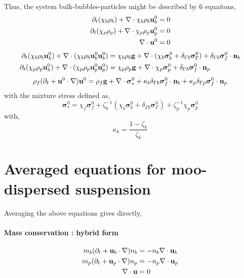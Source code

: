 \documentclass[12pt]{My_preprint}
\begin{document}
Thus, the system bulk-bubbles-particles might be described by 6 equaitons, 
\begin{align}
    \partial_t (\chi_b \rho_b)
    + \mathbf{\nabla}\cdot 
        \chi_b \rho_b \textbf{u}_b^0
    &= 
    0\\
    \partial_t (\chi_p \rho_p)
    + \mathbf{\nabla}\cdot 
        \chi_p \rho_p \textbf{u}_p^0
    &= 
    0\\
    \mathbf{\nabla}\cdot \textbf{u}^0
    &= 
    0
\end{align}
\begin{align}
    \partial_t (\chi_b \rho_b \textbf{u}^0_k)
    + \mathbf{\nabla}\cdot (
        \chi_b \rho_b \textbf{u}^0_b \textbf{u}_b^0
        )
    &= 
    \chi_b \rho_b \textbf{g}
    + \mathbf{\nabla}\cdot (\chi_b \bm\sigma_b^0  + \delta_{\Gamma b} \bm\sigma_\Gamma^0 )
    + \delta_{\Gamma b}  \bm\sigma_f^0 \cdot \textbf{n}_b\\
    \partial_t (\chi_p \rho_p \textbf{u}^0_k)
    + \mathbf{\nabla}\cdot (
        \chi_p \rho_p \textbf{u}^0_p \textbf{u}_p^0
        )
    &= 
    \chi_p \rho_p \textbf{g}
    + \mathbf{\nabla}\cdot \chi_p \bm\sigma_p^0  
    + \delta_{\Gamma b}  \bm\sigma_f^0 \cdot \textbf{n}_p
\end{align}
\begin{equation}
    \rho_f (\partial_t + \textbf{u}^0 \cdot \mathbf{\nabla})\textbf{u}^0
    = 
    \rho_f \textbf{g}
    + \mathbf{\nabla}\cdot \bm\sigma^0_*
    +\kappa_b  \delta_{\Gamma b}  \bm\sigma_f^0 \cdot \textbf{n}_b 
    +\kappa_p  \delta_{\Gamma p}  \bm\sigma_f^0 \cdot \textbf{n}_p 
\end{equation}
with the mixture stress defined as, 
\begin{equation}
    \bm\sigma^0_*
    =
    \chi_f \bm\sigma_f^0  
    +\zeta_b^{-1} (\chi_b \bm\sigma_b^0 + \delta_{\Gamma b} \bm\sigma_\Gamma^0)  
    +\zeta_p^{-1} \chi_p \bm\sigma_p^0 
\end{equation}
with, 
\begin{equation}
    \kappa_k = \frac{1  - \zeta_k}{\zeta_k}
\end{equation}


\section{Averaged equations for moo-dispersed suspension}

Averaging the above equations gives directly, 
\paragraph*{Mass conservation : hybrid form}
\begin{align}
    m_b (\partial_t + \textbf{u}_b \cdot \mathbf{\nabla} )n_b &= - n_b \mathbf{\nabla}\cdot \textbf{u}_b\\
    m_p (\partial_t + \textbf{u}_p \cdot \mathbf{\nabla} )n_p &= - n_p \mathbf{\nabla}\cdot \textbf{u}_p\\
    \mathbf{\nabla}\cdot \textbf{u}
    &= 
    0
\end{align}
\end{document}
